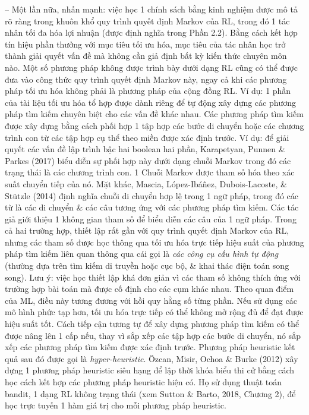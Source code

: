 \documentclass{article}
\begin{document}
\begin{itemize}
\begin{itemize}
\begin{itemize}
            -- Một lần nữa, nhấn mạnh: việc học 1 chính sách bằng kinh nghiệm được mô tả rõ ràng trong khuôn khổ quy trình quyết định Markov của RL, trong đó 1 tác nhân tối đa hóa lợi nhuận (được định nghĩa trong Phần 2.2). Bằng cách kết hợp tín hiệu phần thưởng với mục tiêu tối ưu hóa, mục tiêu của tác nhân học trở thành giải quyết vấn đề mà không cần giả định bất kỳ kiến thức chuyên môn nào. Một số phương pháp không được trình bày dưới dạng RL cũng có thể được đưa vào công thức quy trình quyết định Markov này, ngay cả khi các phương pháp tối ưu hóa không phải là phương pháp của cộng đồng RL. Ví dụ: 1 phần của tài liệu tối ưu hóa tổ hợp được dành riêng để tự động xây dựng các phương pháp tìm kiếm chuyên biệt cho các vấn đề khác nhau. Các phương pháp tìm kiếm được xây dựng bằng cách phối hợp 1 tập hợp các bước di chuyển hoặc các chương trình con từ các tập hợp cụ thể theo miền được xác định trước. Ví dụ: để giải quyết các vấn đề lập trình bậc hai boolean hai phần, Karapetyan, Punnen \& Parkes (2017) biểu diễn sự phối hợp này dưới dạng chuỗi Markov trong đó các trạng thái là các chương trình con. 1 Chuỗi Markov được tham số hóa theo xác suất chuyển tiếp của nó. Mặt khác, Mascia, López-Ibáñez, Dubois-Lacoste, \& Stützle (2014) định nghĩa chuỗi di chuyển hợp lệ trong 1 ngữ pháp, trong đó các từ là các di chuyển \& các câu tương ứng với các phương pháp tìm kiếm. Các tác giả giới thiệu 1 không gian tham số để biểu diễn các câu của 1 ngữ pháp. Trong cả hai trường hợp, thiết lập rất gần với quy trình quyết định Markov của RL, nhưng các tham số được học thông qua tối ưu hóa trực tiếp hiệu suất của phương pháp tìm kiếm liên quan thông qua cái gọi là {\it các công cụ cấu hình tự động} (thường dựa trên tìm kiếm di truyền hoặc cục bộ, \& khai thác điện toán song song). Lưu ý: việc học thiết lập khá đơn giản vì các tham số không thích ứng với trường hợp bài toán mà được cố định cho các cụm khác nhau. Theo quan điểm của ML, điều này tương đương với hồi quy hằng số từng phần. Nếu sử dụng các mô hình phức tạp hơn, tối ưu hóa trực tiếp có thể không mở rộng đủ để đạt được hiệu suất tốt. Cách tiếp cận tương tự để xây dựng phương pháp tìm kiếm có thể được nâng lên 1 cấp nếu, thay vì sắp xếp các tập hợp các bước di chuyển, nó sắp xếp các phương pháp tìm kiếm được xác định trước. Phương pháp heuristic kết quả sau đó được gọi là {\it hyper-heuristic}. Özcan, Misir, Ochoa \& Burke (2012) xây dựng 1 phương pháp heuristic siêu hạng để lập thời khóa biểu thi cử bằng cách học cách kết hợp các phương pháp heuristic hiện có. Họ sử dụng thuật toán bandit, 1 dạng RL không trạng thái (xem Sutton \& Barto, 2018, Chương 2), để học trực tuyến 1 hàm giá trị cho mỗi phương pháp heuristic.


\end{itemize}
\end{itemize}
\end{itemize}
\end{document}
